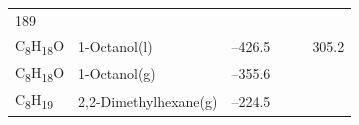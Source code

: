 \documentclass[
  9pt,
]{extbook}
\theoremstyle{definition}
\theoremstyle{definition}
\theoremstyle{definition}
\theoremstyle{remark}
\begin{document}
\begin{longtable}[]{@{}llllll@{}}
\begin{minipage}[t]{0.14\columnwidth}
189\strut
\end{minipage}\tabularnewline
\begin{minipage}[t]{0.07\columnwidth}\raggedright
C\textsubscript{8}H\textsubscript{18}O\strut
\end{minipage} & \begin{minipage}[t]{0.17\columnwidth}\raggedright
1-Octanol(l)\strut
\end{minipage} & \begin{minipage}[t]{0.15\columnwidth}\raggedright
--426.5\strut
\end{minipage} & \begin{minipage}[t]{0.15\columnwidth}\raggedright
\strut
\end{minipage} & \begin{minipage}[t]{0.14\columnwidth}\raggedright
\strut
\end{minipage} & \begin{minipage}[t]{0.14\columnwidth}\raggedright
305.2\strut
\end{minipage}\tabularnewline
\begin{minipage}[t]{0.07\columnwidth}\raggedright
C\textsubscript{8}H\textsubscript{18}O\strut
\end{minipage} & \begin{minipage}[t]{0.17\columnwidth}\raggedright
1-Octanol(g)\strut
\end{minipage} & \begin{minipage}[t]{0.15\columnwidth}\raggedright
--355.6\strut
\end{minipage} & \begin{minipage}[t]{0.15\columnwidth}\raggedright
\strut
\end{minipage} & \begin{minipage}[t]{0.14\columnwidth}\raggedright
\strut
\end{minipage} & \begin{minipage}[t]{0.14\columnwidth}\raggedright
\strut
\end{minipage}\tabularnewline
\begin{minipage}[t]{0.07\columnwidth}\raggedright
C\textsubscript{8}H\textsubscript{19}\strut
\end{minipage} & \begin{minipage}[t]{0.17\columnwidth}\raggedright
2,2-Dimethylhexane(g)\strut
\end{minipage} & \begin{minipage}[t]{0.15\columnwidth}\raggedright
--224.5\strut
\end{minipage} & \begin{minipage}[t]{0.15\columnwidth}\raggedright

\end{minipage}
\end{longtable}
\end{document}
